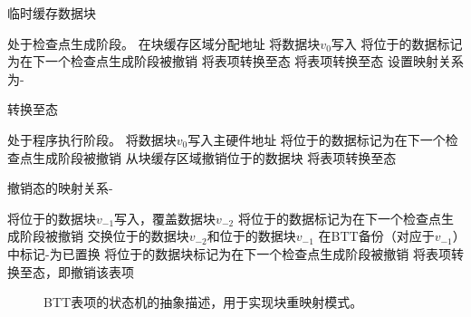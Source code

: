 \begin{algorithm} [!h]
\caption{临时缓存数据块}
\label{alg-hold}
\begin{algorithmic}[1]
\Require 处于检查点生成阶段。
\State 在块缓存区域分配地址
\State 将数据块$v_0$写入
  \State 将位于的数据标记为在下一个检查点生成阶段被撤销
  \State 将表项转换至态
  \State 将表项转换至态
\EndIf
\State 设置映射关系为- 
\end{algorithmic}
\end{algorithm}

\begin{algorithm} [!h]
\caption{转换至态}
\label{alg-hide}
\begin{algorithmic}[1]
\Require 处于程序执行阶段。
\State 将数据块$v_0$写入主硬件地址 
  \State 将位于的数据标记为在下一个检查点生成阶段被撤销
  \State 从块缓存区域撤销位于的数据块
\EndIf
\State 将表项转换至态 
\end{algorithmic}
\end{algorithm}

\begin{algorithm} [!h]
\caption{撤销态的映射关系-}
\label{alg-free-c}
\begin{algorithmic}[1]
  \State 将位于的数据块$v_{-1}$写入，覆盖数据块$v_{-2}$ 
  \State 将位于的数据标记为在下一个检查点生成阶段被撤销
\Else {}
  \State 交换位于的数据块$v_{-2}$和位于的数据块$v_{-1}$ 
  \Statex {}
  \State 在BTT备份（对应于$v_{-1}$）中标记-为已置换
  \State 将位于的数据块标记为在下一个检查点生成阶段被撤销
\EndIf
\State 将表项转换至态，即撤销该表项 
\end{algorithmic}
\end{algorithm}

\begin{figure}[!t]
\centering

\caption{BTT表项的状态机的抽象描述，用于实现块重映射模式。}
\label{fig:asm}
\end{figure}

